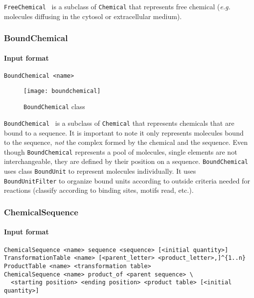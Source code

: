 \texttt{FreeChemical}~ is a subclass of \texttt{Chemical} that represents free chemical (\textit{e.g.} molecules diffusing in the cytosol or extracellular medium).

\subsubsection{BoundChemical}

\paragraph{Input format}
\begin{verbatim}
BoundChemical <name>
\end{verbatim}

\begin{figure}[!h]
  \centering
  \texttt{[image: boundchemical]}
  \caption{\texttt{BoundChemical} class}
  \label{fig:bound_chemical}
\end{figure}

\texttt{BoundChemical}~ is a subclass of \texttt{Chemical} that represents chemicals that are bound to a sequence. It is important to note it only represents molecules bound to the sequence, \emph{not} the complex formed by the chemical and the sequence. Even though \texttt{BoundChemical} represents a pool of molecules, single elements are not interchangeable, they are defined by their position on a sequence. \texttt{BoundChemical} uses class \texttt{BoundUnit} to represent molecules individually. It uses \texttt{BoundUnitFilter} to organize bound units according to outside criteria needed for reactions (classify according to binding sites, motifs read, etc.).

\subsubsection{ChemicalSequence}

\paragraph{Input format}
\begin{verbatim}
ChemicalSequence <name> sequence <sequence> [<initial quantity>]
TransformationTable <name> [<parent_letter> <product_letter>,]^{1..n}
ProductTable <name> <transformation table>
ChemicalSequence <name> product_of <parent sequence> \
  <starting position> <ending position> <product table> [<initial quantity>]
\end{verbatim}

